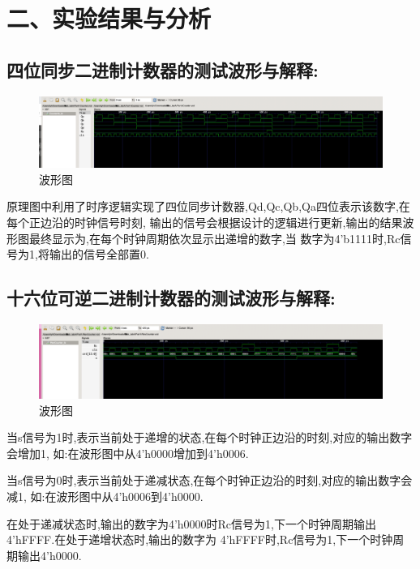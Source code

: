 \documentclass{article}
\begin{document}
\section*{二、实验结果与分析}

\subsection*{四位同步二进制计数器的测试波形与解释:}

    \begin{figure}[H]
    \centering
    \includegraphics[width=1\textwidth]{lab10p/2.png}
    \caption{\label{Lab10}波形图}
    \end{figure}

原理图中利用了时序逻辑实现了四位同步计数器,{Qd,Qc,Qb,Qa}四位表示该数字,在每个正边沿的时钟信号时刻,
输出的信号会根据设计的逻辑进行更新,输出的结果波形图最终显示为,在每个时钟周期依次显示出递增的数字,当
数字为4'b1111时,Rc信号为1,将输出的信号全部置0.

\subsection*{十六位可逆二进制计数器的测试波形与解释:}
\begin{figure}[H]
    \centering
    \includegraphics[width=1\textwidth]{lab10p/1.png}
    \caption{\label{Lab10}波形图}
    \end{figure}

当s信号为1时,表示当前处于递增的状态,在每个时钟正边沿的时刻,对应的输出数字会增加1,
如:在波形图中从4'h0000增加到4'h0006.

当s信号为0时,表示当前处于递减状态,在每个时钟正边沿的时刻,对应的输出数字会减1,
如:在波形图中从4'h0006到4'h0000.

在处于递减状态时,输出的数字为4'h0000时Rc信号为1,下一个时钟周期输出4'hFFFF.在处于递增状态时,输出的数字为
4'hFFFF时,Rc信号为1,下一个时钟周期输出4'h0000.
\end{document}
